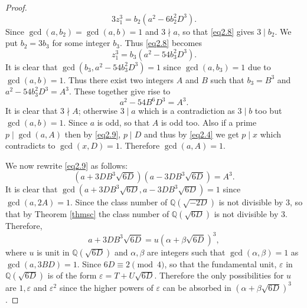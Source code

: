 \documentclass[12pt, 14paper,reqno]{amsart}
\theoremstyle{plain}
\theoremstyle{proof}
\numberwithin{equation}{section}
\begin{document}
\begin{proof}
\begin{equation}\label{eq2.8}
3z_1^3=b_2(a^2-6b_2^2D^3).
\end{equation}
Since $\gcd(a, b_2)=\gcd(a,b)=1$ and $3\nmid a$, so that \eqref{eq2.8} gives $3\mid b_2$. We put $b_2=3b_3$ for some integer $b_3$. Thus \eqref{eq2.8} becomes
\begin{equation*}%
z_1^3=b_3(a^2-54b_3^2D^3).
\end{equation*}
It is clear that $\gcd(b_3, a^2-54b_3^2D^3)=1$ since $\gcd(a,b_3)=1$ due to $\gcd(a,b)=1$. Thus there exist two integers $A$ and $B$ such that $b_3=B^3$ and $a^2-54b_3^2D^3=A^3$. These together give rise to 
\begin{equation}\label{eq2.9}
a^2-54B^6D^3=A^3.
\end{equation} 
It is clear that $3\nmid A$; otherwise $3\mid a$ which is a contradiction as $3\mid b$ too but $\gcd(a,b)=1$. Since $a$ is odd, so that $A$ is odd too. Also if a prime $p\mid \gcd(a,A)$ then by \eqref{eq2.9}, $p\mid D$ and thus by \eqref{eq2.4} we get $p\mid x$ which contradicts to $\gcd(x, D)=1$. Therefore $\gcd(a, A)=1$.

We now rewrite \eqref{eq2.9} as follows:
$$\left(a+3DB^3\sqrt{6D}\right)\left(a-3DB^3\sqrt{6D}\right)=A^3.$$
It is clear that $\gcd\left(a+3DB^3\sqrt{6D},a-3DB^3\sqrt{6D}\right)=1$ since $\gcd(a,2A)=1$.
Since the class number of $\mathbb{Q}(\sqrt{-2D})$ is not divisible by $3$, so that by 
Theorem \ref{thmsc} the class number of $\mathbb{Q}(\sqrt{6D})$ is not divisible by $3$. Therefore, 
\begin{equation}\label{eq2.10}
a+3DB^3\sqrt{6D}=u\left(\alpha+\beta\sqrt{6D}\right)^3,
\end{equation}
where $u$ is unit in $\mathbb{Q}(\sqrt{6D})$ and $\alpha, \beta$ are integers such that $\gcd(\alpha, \beta)=1$ as $\gcd(a, 3BD)=1$. Since $6D\equiv 2\pmod 4$, so that the fundamental unit, $\varepsilon$ in $\mathbb{Q}(\sqrt{6D})$ is of the form $ \varepsilon=T+U\sqrt{6D}$. Therefore the only possibilities for $u$ are $1, \varepsilon$ and $\varepsilon^2$ since the higher powers of $\varepsilon$ can be  absorbed in $(\alpha+\beta\sqrt{6D})^3$. 


\end{proof}
\end{document}

